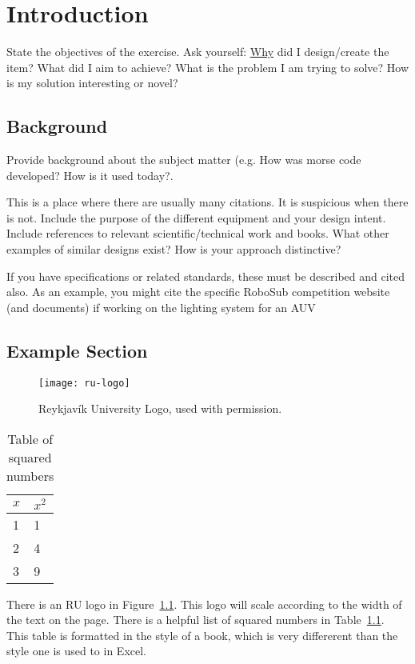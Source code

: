 \chapter{Introduction\label{cha:introduction}}
State the objectives of the exercise. Ask yourself:
\underline{Why} did I design/create the item? What did I aim to
achieve? What is the problem I am trying to solve?  How is my
solution interesting or novel?

\section{Background}
Provide background about the subject matter (e.g. How was morse code
developed?  How is it used today?.

This is a place where there are usually many citations.
It is suspicious when there is not.
Include the purpose of the different equipment and your design intent. 
Include references to relevant scientific/technical work and books.
What other examples of similar designs exist?
How is your approach distinctive?

If you have specifications or related standards, these must be
described and cited also.  As an example, you might cite the specific
RoboSub competition website (and documents) if working on the lighting system for an AUV\cite{guls2016auvlight}

\section{Example Section}
\begin{figure}
  \centering
  \texttt{[image: ru-logo]}
  \caption[RU Logo]{Reykjavík University Logo, used with permission.}\label{fig:ru-logo}
\end{figure}
\begin{table}
  \centering
  \begin{tabular}{ll}\toprule
    $x$& $x^{2}$\\\midrule
    1 &1\\
    2 &4\\
    3 &9\\\bottomrule
  \end{tabular}
  \caption{Table of squared numbers}\label{tab:numbers}
\end{table}
There is an RU logo in Figure~\ref{fig:ru-logo}.
This logo will scale according to the width of the text on the page.
There is a helpful list of squared numbers in Table~\ref{tab:numbers}.
This table is formatted in the style of a book, which is very differerent than the style one is used to in Excel.

